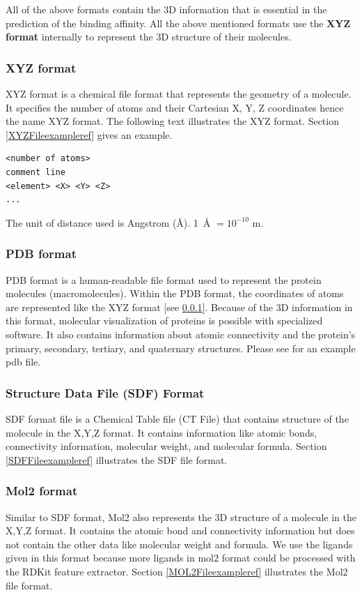 \documentclass[11pt]{article}
\begin{document}
All of the above formats contain the 3D information that is essential in the prediction of the binding affinity.
All the above mentioned formats use the \textbf{XYZ format} internally to represent the 3D structure of their molecules.

\subsubsection{XYZ format}
\label{xyz_format}
XYZ format is a chemical file format that represents the geometry of a molecule.
It specifies the number of atoms and their Cartesian X, Y, Z coordinates hence the name XYZ format.
The following text illustrates the XYZ format.
Section \ref{XYZFileexampleref} gives an example.
\cite{XYZ_format}
\begin{verbatim}
<number of atoms>
comment line
<element> <X> <Y> <Z>
...
\end{verbatim}

The unit of distance used is Angstrom (\si{\angstrom}).  \SI{1}{\angstrom} $ = 10^{-10}$ m.
\cite{XYZ_format}

\subsubsection{PDB format}
PDB format is a human-readable file format used to represent the protein molecules (macromolecules).
Within the PDB format,  the coordinates of atoms are represented like the XYZ format [see \ref{xyz_format}].
Because of the 3D information in this format,  molecular visualization of proteins is possible with specialized software. 
It also contains information about atomic connectivity and the protein's primary,  secondary,  tertiary,  and quaternary structures.
\cite{pdb_file_format}
\cite{understanding_pdb_format}
Please see \cite{examplePDBFile} for an example pdb file.


\subsubsection{Structure Data File (SDF) Format}
SDF format file is a Chemical Table file (CT File) that contains structure of the molecule in the X,Y,Z format.
It contains information like atomic bonds,  connectivity information,  molecular weight,  and molecular formula. \cite{SDFformat}
Section \ref{SDFFileexampleref} illustrates the SDF file format.

\subsubsection{Mol2 format}
Similar to SDF format,  Mol2 also represents the 3D structure of a molecule in the X,Y,Z format.
It contains the atomic bond and connectivity information but does not contain the other data like molecular weight and formula.
We use the ligands given in this format because more ligands in mol2 format could be processed with the RDKit feature extractor.
Section \ref{MOL2Fileexampleref} illustrates the Mol2 file format.
\end{document}
